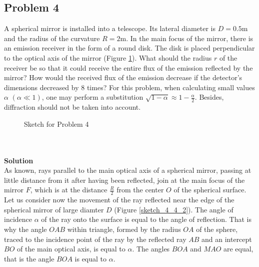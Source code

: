 \documentclass[12pt,a4paper]{book}
\begin{document}
	\subsection*{Problem 4}
	A spherical mirror is installed into a telescope. Its lateral diameter is $D=0.5\text{m}$ and the radius of the curvature $R=2\text{m}$. In the main focus of the mirror, there is an emission receiver in the form of a round disk. The disk is placed perpendicular to the optical axis of the mirror (Figure \ref{sketch_4_4_1}). What should the radius $r$ of the receiver be so that it could receive the entire flux of the emission reflected by the mirror? How would the received flux of the emission decrease if the detector's dimensions decreased by 8 times? For this problem, when calculating small values $\alpha$ $(\alpha\ll1)$, one may perform a substitution $\sqrt{1-\alpha}\approx1-\frac{\alpha}{2}$. Besides, dif\mbox{}fraction should not be taken into account.
	\begin{figure}
		[!hbtp]
		\centering
		\caption{Sketch for Problem 4}
		\label{sketch_4_4_1}
	\end{figure}\\ \\
	\textbf{Solution}\\
	As known, rays parallel to the main optical axis of a spherical mirror, passing at little distance from it after having been ref\mbox{}lected, join at the main focus of the mirror $F$, which is at the distance $\frac{R}{2}$ from the center $O$ of the spherical surface. Let us consider now the movement of the ray ref\mbox{}lected near the edge of the spherical mirror of large diamter $D$ (Figure \ref{sketch_4_4_2}). The angle of incidence $\alpha$ of the ray onto the surface is equal to the angle of ref\mbox{}lection. That is why the angle $OAB$ within triangle, formed by the radius $OA$ of the sphere, traced to the incidence point of the ray by the ref\mbox{}lected ray $AB$ and an intercept $BO$ of the main optical axis, is equal to $\alpha$. The angles $BOA$ and $MAO$ are equal, that is the angle $BOA$ is equal to $\alpha$.
\end{document}
